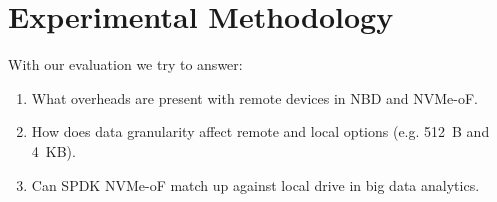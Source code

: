 \section{Experimental Methodology}
With our evaluation we try to answer: 

\begin{enumerate}[itemsep=1.5pt]
    \item What overheads are present with remote devices in NBD and NVMe-oF.
    \item How does data granularity affect remote and local options (e.g. \SI{512}{B} and \SI{4}{KB}).
    \item Can SPDK NVMe-oF match up against local drive in big data analytics.
\end{enumerate}

\vspace{1em}

